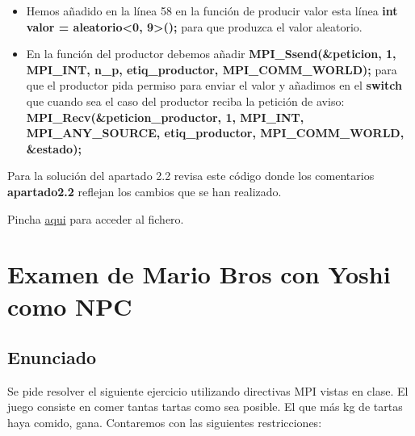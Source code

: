 \documentclass[a4paper,12pt]{article}
\begin{document}
\begin{itemize}
    \item Hemos añadido en la línea 58 en la función de producir valor esta línea \textbf{int valor = aleatorio<0, 9>();} para que produzca el valor aleatorio.
    \item En la función del productor debemos añadir \textbf{MPI\_Ssend(\&peticion, 1, MPI\_INT, n\_p, etiq\_productor, MPI\_COMM\_WORLD);} para que el productor pida permiso para enviar el valor y añadimos en el \textbf{switch} que cuando sea el caso del productor reciba la petición de aviso: \textbf{MPI\_Recv(\&peticion\_productor, 1, MPI\_INT, MPI\_ANY\_SOURCE, etiq\_productor, MPI\_COMM\_WORLD, \&estado);}
\end{itemize}


Para la solución del apartado 2.2 revisa este código donde los comentarios \textbf{apartado2.2} reflejan los cambios que se han realizado.


Pincha \href{https://github.com/ElblogdeIsmael/ElblogdeIsmael.github.io/blob/main/Asignaturas/Tercer%20A%C3%B1o/SCD/Examenes/SegundoParcial/ETSIIT/code/prodcons2-mu.cpp}{aqui} para acceder al fichero.


\section{Examen de Mario Bros con Yoshi como NPC}

\subsection{Enunciado}

Se pide resolver el siguiente ejercicio utilizando directivas MPI vistas en clase. El juego consiste en comer tantas tartas como sea posible. El que más kg de tartas haya comido, gana. Contaremos con las siguientes restricciones:
\end{document}
